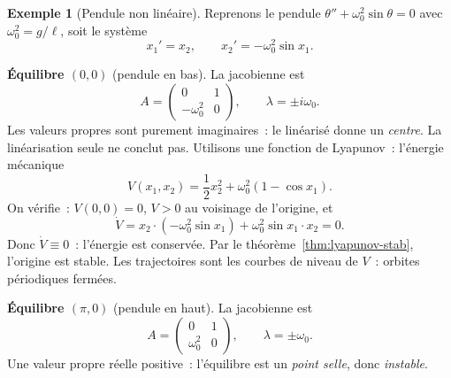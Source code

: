 \documentclass[12pt,a4paper,openany]{book}
\theoremstyle{definition}
\newtheorem{exemple}[definition]{Exemple}
\theoremstyle{plain}
\theoremstyle{remark}
\begin{document}
\begin{exemple}[Pendule non linéaire]\label{ex:stab-pendule}
  Reprenons le pendule $\theta''+\omega_0^2\sin\theta=0$ avec
  $\omega_0^2=g/\ell$, soit le système
  \[
    x_1'=x_2, \qquad x_2'=-\omega_0^2\sin x_1.
  \]

  \textbf{Équilibre $(0,0)$} (pendule en bas). La jacobienne est
  \[
    A=\begin{pmatrix}0&1\\-\omega_0^2&0\end{pmatrix},
    \qquad \lambda=\pm i\omega_0.
  \]
  Les valeurs propres sont purement imaginaires~: le linéarisé donne
  un \emph{centre}. La linéarisation seule ne conclut pas.
  Utilisons une fonction de Lyapunov~: l'énergie mécanique
  \[
    V(x_1,x_2)=\frac{1}{2}x_2^2+\omega_0^2(1-\cos x_1).
  \]
  On vérifie~: $V(0,0)=0$, $V>0$ au voisinage de l'origine, et
  \[
    \dot{V}=x_2\cdot(-\omega_0^2\sin x_1)+\omega_0^2\sin x_1\cdot x_2=0.
  \]
  Donc $\dot{V}\equiv 0$~: l'énergie est conservée. Par le
  théorème~\ref{thm:lyapunov-stab}, l'origine est stable. Les
  trajectoires sont les courbes de niveau de $V$~: orbites
  périodiques fermées.

  \textbf{Équilibre $(\pi,0)$} (pendule en haut). La jacobienne est
  \[
    A=\begin{pmatrix}0&1\\\omega_0^2&0\end{pmatrix},
    \qquad \lambda=\pm\omega_0.
  \]
  Une valeur propre réelle positive~: l'équilibre est un
  \emph{point selle}, donc \emph{instable}.

  \begin{center}
  \end{center}
\end{exemple}
\end{document}
